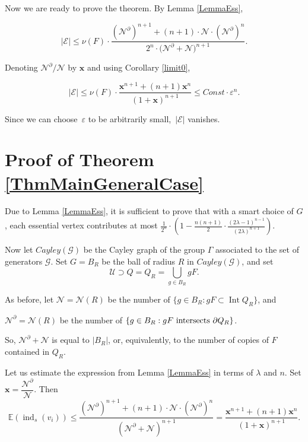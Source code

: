 \documentclass[12pt]{amsart}
\theoremstyle{plain}
\theoremstyle{definition}
\theoremstyle{plain}
\theoremstyle{definition}
\renewcommand{\leq}{\leqslant}
\DeclareMathOperator{\Int}{Int}
\DeclareMathOperator{\ind}{ind}
\begin{document}
 
 \fi
Now we are ready to prove the theorem. By Lemma \ref{LemmaEss}, 

$$|\mathcal{E}| \leq \nu(F)\cdot \frac{(\mathcal{N}^\partial)^{n+1} +(n+1)\cdot \mathcal{N} \cdot (\mathcal{N}^\partial)^{n}}{2^n \cdot \Big(\mathcal{N}^\partial + \mathcal{N}\Big)^{n+1}}.$$

Denoting $\mathcal{N}^{\partial}/\mathcal{N}$ by $\mathbf{x}$ and using Corollary \ref{limit0},

$$|\mathcal{E}| \leq \nu(F) \cdot  \dfrac{\mathbf{x}^{n+1} + (n+1)\mathbf{x}^n}{(1+\mathbf{x})^{n+1}}\leq Const \cdot \varepsilon^n.$$ 
 
Since we can choose~$\varepsilon$ to be arbitrarily small,~$|\mathcal{E}|$  vanishes.


      
   

  
 \section{Proof of Theorem \ref{ThmMainGeneralCase}} 
 
 
 Due to Lemma \ref{LemmaEss}, it is sufficient to prove that with a smart choice of $G$, each essential vertex contributes at most $\frac{1}{2^n}\cdot\left( 1-\frac{n(n+1)}{2}\cdot \frac{(2\lambda-1)^{n-1}}{(2\lambda)^{n+1}}\right)$.
 
 
    Now let $Cayley(\mathcal{G})$  be the Cayley graph of the group $\Gamma$ associated to the set of generators $\mathcal{G}$. Set $G=B_R$ be the ball of radius  $R$ in $Cayley(\mathcal{G})$, and set $$\mathcal{U} \supset Q=Q_R= \bigcup_{g \in B_R} gF.$$ 
    
As before, let $\mathcal{N}=\mathcal{N}(R)$ be the number of $\{g\in B_R: gF\subset \Int Q_R\}$, and
 
 $\mathcal{N}^\partial=\mathcal{N}(R)$ be the number of $\{g\in B_R: gF \hbox{  intersects } \partial Q_R\}$.
 
 So, $\mathcal{N}^\partial +\mathcal{N}$ is equal to $|B_R|$, or, equivalently, to the number of copies of $F$ contained in $Q_R$.
 

 \medskip
 
 

 

    Let us estimate the expression from Lemma \ref{LemmaEss} in terms of $\lambda$ and $n$. Set $\mathbf{x} = \dfrac{\mathcal{N}^\partial}{\mathcal{N}}$. Then $$ \mathbb{E}(\ind_s(v_i)) \leq \dfrac{(\mathcal{N}^\partial)^{n+1} +(n+1)\cdot \mathcal{N} \cdot (\mathcal{N}^\partial)^{n}}{\left(\mathcal{N}^\partial + \mathcal{N}\right)^{n+1}} = \dfrac{\mathbf{x}^{n+1} + (n+1)\mathbf{x}^n}{(1+\mathbf{x})^{n+1}}. $$ 
\end{document}
